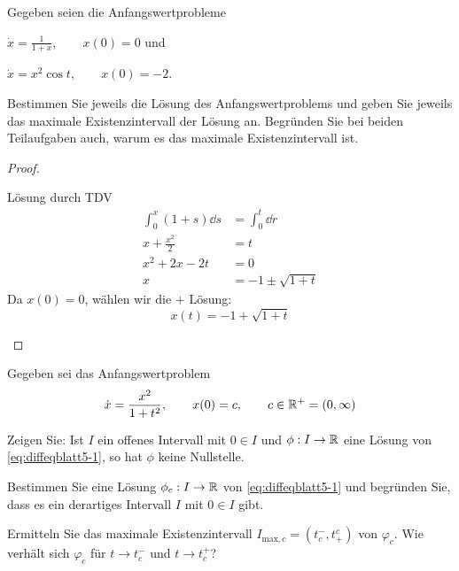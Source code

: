 \begin{Problem}
	Gegeben seien die Anfangswertprobleme
	\begin{parts}
		\item $\dot{x}=\frac{1}{1+x},\qquad x(0)=0$ und
		\item $\dot{x}=x^2\cos t,\qquad x(0)=-2$.
	\end{parts}
	Bestimmen Sie jeweils die Lösung des Anfangswertproblems und geben Sie jeweils das maximale Existenzintervall der Lösung an. Begründen Sie bei beiden Teilaufgaben auch, warum es das maximale Existenzintervall ist.
\end{Problem}
\begin{proof}
	\begin{parts}
		\item L\"{o}sung durch TDV
		\begin{align*}
		\int_0^x (1+s)\dd{s}&=\int_0^t \dd{r}\\
		x+\frac{x^2}{2}&=t\\
		x^2+2x - 2t &= 0\\
		x&=-1 \pm \sqrt{1 + t}
		\end{align*}
		Da $x(0)=0$, wählen wir die $+$ L\"{o}sung:
		\[x(t)=-1+\sqrt{1+t}\]
	\end{parts}
	\end{proof}
\begin{Problem}
	Gegeben sei das Anfangswertproblem
	\begin{equation}\label{eq:diffeqblatt5-1}
		\dot{x}=\frac{x^2}{1+t^2},\qquad x(0)=c,\qquad c\in \mathbb{R}^+=(0,\infty)
	\end{equation}
	\begin{parts}
		\item Zeigen Sie: Ist $I$ ein offenes Intervall mit $0 \in I$ und $\phi : I\to  \mathbb{R}$ eine Lösung von \eqref{eq:diffeqblatt5-1}, so hat $\phi$ keine Nullstelle.
		\item Bestimmen Sie eine Lösung $\phi_c : I\to \mathbb{R}$ von \eqref{eq:diffeqblatt5-1} und begründen Sie, dass es ein derartiges Intervall $I$ mit $0 \in I$ gibt.
		\item Ermitteln Sie das maximale Existenzintervall $I_{\text{max},c} = (t^-_c , t^c_+)$ von $\varphi_c$. Wie verhält sich $\varphi_c$ für $t \to t_c^-$ und $t\to t_c^+$?
		\end{parts}
\end{Problem}